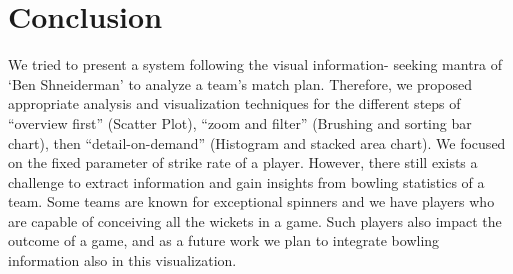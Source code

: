 \documentclass[10pt,journal,compsoc]{IEEEtran}
\begin{document}
%






\section{Conclusion}
We tried to present a system following the visual information-
seeking  mantra\cite{mantra}  of  `Ben  Shneiderman'  to  analyze  a  team's match plan. Therefore, we proposed appropriate analysis and
visualization techniques for the different steps of ``overview
first'' (Scatter Plot), ``zoom and filter'' (Brushing and sorting bar chart), then ``detail-on-demand'' (Histogram and stacked area chart). We focused on the fixed parameter of strike rate of a player. However, there still exists a challenge to extract information and gain insights from bowling statistics of a team. Some teams are known for exceptional spinners and we have players who are capable of conceiving all the wickets in a game. Such players also impact the outcome of a game, and as a future work we plan to integrate bowling information also in this visualization.\\
\end{document}
